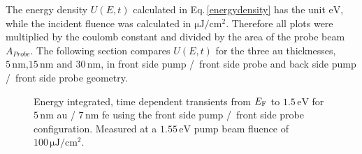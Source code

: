 \documentclass[a4paper,12pt,twoside]{article}
\begin{document}
The energy density $U(E,t)$ calculated in Eq.\,\ref{energydensity} has the unit $\mathrm{{eV}}$, while the incident fluence was calculated in $\mathrm{{\mu J/cm^{2}}}$. Therefore all plots were multiplied by the coulomb constant and divided by the area of the probe beam $A_{Probe}$.
The following section compares $U(E,t)$ for the three \gls{au} thicknesses, $5\,\mathrm{{nm}}$,$15\,\mathrm{{nm}}$ and $30\,\mathrm{{nm}}$, in front side pump /\, front side probe and back side pump /\, front side probe geometry.
\begin{figure}[H]
		\caption{Energy integrated, time dependent transients from $E_{\rm{F}}$ to $1.5\,\mathrm{{eV}}$ for $5\,\mathrm{{nm}}$ \gls{au} / $7\,\mathrm{{nm}}$ \gls{fe} using the front side pump /\, front side probe configuration. Measured at a $1.55\,\mathrm{eV}$ pump beam fluence of $100\,\mathrm{\mu J/cm^2}$.}
	    	\label{5FP}
	\end{figure}
\noindent
\end{document}
